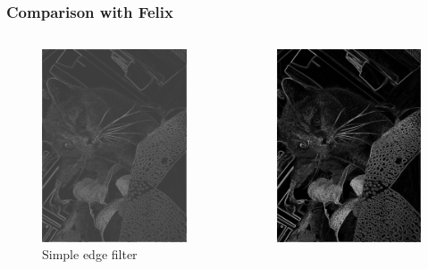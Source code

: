 \begin{frame}
	\frametitle{Comparison with Felix}
	\begin{columns}
		\begin{column}{0.33\textwidth}
			\begin{figure}
				\centering
				\includegraphics[width=0.8\linewidth]{images/KadseSimple}
				\caption[Simple edge filter]{Simple edge filter}
				\label{fig:Simple}
			\end{figure}
		\end{column}
		\begin{column}{0.33\textwidth}
				\begin{figure}
					\centering
					\includegraphics[width=0.8\linewidth]{images/KadsePrewitt}

\end{figure}
\end{column}
\end{columns}
\end{frame}
